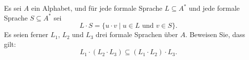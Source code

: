 \documentclass[12pt]{article}
\begin{document}

%


\begin{aufgabe}[2]
  Es sei $A$ ein Alphabet, und für jede formale Sprache $L \subseteq A^*$ und
  jede formale Sprache $S \subseteq A^*$ sei
  \begin{equation*}
    L \cdot S = \{ u \cdot v \mid u \in L \text{ und } v \in S \}.
  \end{equation*}
  Es seien ferner $L_1$, $L_2$ und $L_3$ drei formale Sprachen über $A$.
  Beweisen Sie, dass gilt:
  \begin{equation*}
    L_1 \cdot (L_2 \cdot L_3) \subseteq (L_1 \cdot L_2) \cdot L_3.
  \end{equation*}
\end{aufgabe}
\end{document}
